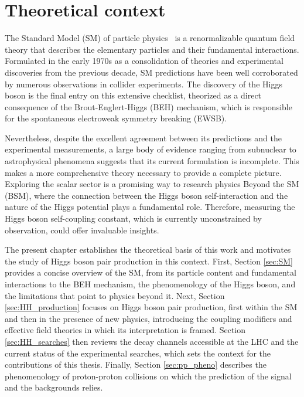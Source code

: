 \chapter{Theoretical context}
\label{ch:theory}
\noindent The Standard Model (SM) of particle physics~\cite{Herrero:1998eq,Thomson:2013zua} is a renormalizable quantum field theory that describes the elementary particles and their fundamental interactions. Formulated in the early 1970s as a consolidation of theories and experimental discoveries from the previous decade, SM predictions have been well corroborated by numerous observations in collider experiments. The discovery of the Higgs boson is the final entry on this extensive checklist, theorized as a direct consequence of the Brout-Englert-Higgs (BEH) mechanism, which is responsible for the spontaneous electroweak symmetry breaking (EWSB).

Nevertheless, despite the excellent agreement between its predictions and the experimental measurements, a large body of evidence ranging from subnuclear to astrophysical phenomena suggests that its current formulation is incomplete. This makes a more comprehensive theory necessary to provide a complete picture. Exploring the scalar sector is a promising way to research physics Beyond the SM (BSM), where the connection between the Higgs boson self-interaction and the nature of the Higgs potential plays a fundamental role. Therefore, measuring the Higgs boson self-coupling constant, which is currently unconstrained by observation, could offer invaluable insights.

The present chapter establishes the theoretical basis of this work and motivates the study of Higgs boson pair production in this context. First, Section \ref{sec:SM} provides a concise overview of the SM, from its particle content and fundamental interactions to the BEH mechanism, the phenomenology of the Higgs boson, and the limitations that point to physics beyond it. Next, Section \ref{sec:HH_production} focuses on Higgs boson pair production, first within the SM and then in the presence of new physics, introducing the coupling modifiers and effective field theories in which its interpretation is framed. Section \ref{sec:HH_searches} then reviews the decay channels accessible at the LHC and the current status of the experimental searches, which sets the context for the contributions of this thesis. Finally, Section \ref{sec:pp_pheno} describes the phenomenology of proton-proton collisions on which the prediction of the signal and the backgrounds relies.


